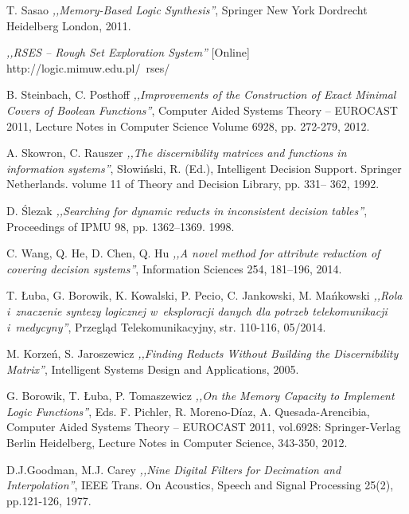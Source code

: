 \begin{thebibliography}{99}
 T. Sasao \emph{,,Memory-Based Logic Synthesis''}, Springer New York Dordrecht Heidelberg London, 2011.

 \emph{,,RSES – Rough Set Exploration System''} [Online] http://logic.mimuw.edu.pl/~rses/

 B. Steinbach, C. Posthoff \emph{,,Improvements of the Construction of Exact Minimal Covers of Boolean Functions''}, Computer Aided Systems Theory – EUROCAST 2011, Lecture Notes in Computer Science Volume 6928, pp. 272-279, 2012.

 A. Skowron, C. Rauszer \emph{,,The discernibility matrices and functions in information systems''}, Słowiński, R. (Ed.), Intelligent Decision Support. Springer Netherlands. volume 11 of Theory and Decision Library, pp. 331– 362, 1992.

 D. Ślezak \emph{,,Searching for dynamic reducts in inconsistent decision tables''}, Proceedings of IPMU 98, pp. 1362–1369. 1998.

 C. Wang, Q. He, D. Chen, Q. Hu \emph{,,A novel method for attribute reduction of covering decision systems''}, Information Sciences 254, 181–196, 2014.

 T. Łuba, G. Borowik, K. Kowalski, P. Pecio, C. Jankowski, M. Mańkowski \emph{,,Rola i~znaczenie syntezy logicznej w~eksploracji danych dla potrzeb telekomunikacji i~medycyny''}, Przegląd Telekomunikacyjny, str. 110-116, 05/2014.

 M. Korzeń, S. Jaroszewicz \emph{,,Finding Reducts Without Building the Discernibility Matrix''}, Intelligent Systems Design and Applications, 2005.

 G. Borowik, T. Łuba, P. Tomaszewicz \emph{,,On the Memory Capacity to Implement Logic Functions''}, Eds. F. Pichler, R. Moreno-Díaz, A. Quesada-Arencibia, Computer Aided Systems Theory – EUROCAST 2011, vol.6928: Springer-Verlag Berlin Heidelberg, Lecture Notes in Computer Science, 343-350, 2012.

 D.J.Goodman, M.J. Carey \emph{,,Nine Digital Filters for Decimation and Interpolation''}, IEEE Trans. On Acoustics, Speech and Signal Processing 25(2), pp.121-126, 1977.

\end{thebibliography}
\clearpage




